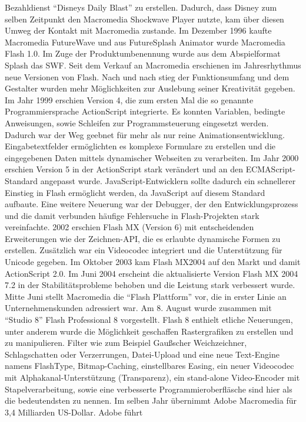 Bezahldienst ``Disneys Daily Blast'' zu erstellen. Dadurch, dass Disney zum
selben Zeitpunkt den Macromedia Shockwave Player nutzte, kam über diesen
Umweg der Kontakt mit Macromedia zustande. Im Dezember 1996 kaufte Macromedia
FutureWave und aus FutureSplash Animator wurde Macromedia Flash 1.0. Im
Zuge der Produktumbenennung wurde aus dem Abspielformat Splash das SWF.
Seit dem Verkauf an Macromedia erschienen im Jahresrhythmus neue Versionen
von Flash. Nach und nach stieg der Funktionsumfang und dem Gestalter
wurden mehr Möglichkeiten zur Auslebung seiner Kreativität gegeben. Im Jahr
1999 erschien Version 4, die zum ersten Mal die so genannte Programmiersprache
ActionScript integrierte. Es konnten Variablen, bedingte Anweisungen, sowie
Schleifen zur Programmsteuerung eingesetzt werden. Dadurch war der Weg
geebnet für mehr als nur reine Animationsentwicklung. Eingabetextfelder
ermöglichten es komplexe Formulare zu erstellen und die eingegebenen
Daten mittels dynamischer Webseiten zu verarbeiten. Im Jahr 2000 erschien
Version 5 in der ActionScript stark verändert und an den ECMAScript-Standard
angepasst wurde. JavaScript-Entwicklern sollte dadurch ein schnellerer
Einstieg in Flash ermöglicht werden, da JavaScript auf diesem Standard
aufbaute. Eine weitere Neuerung war der Debugger, der den Entwicklungsprozess
und die damit verbunden häufige Fehlersuche in Flash-Projekten stark
vereinfachte. 2002 erschien Flash MX (Version 6) mit entscheidenden
Erweiterungen wie der Zeichnen-API, die es erlaubte dynamische Formen zu
erstellen. Zusätzlich war ein Videocodec integriert und die Unterstützung für
Unicode gegeben. Im Oktober 2003 kam Flash MX2004 auf den Markt und damit
ActionScript 2.0. Im Juni 2004 erscheint die aktualisierte Version Flash
MX 2004 7.2 in der Stabilitätsprobleme behoben und die Leistung stark
verbessert wurde. Mitte Juni stellt Macromedia die "`Flash Plattform"' vor,
die in erster Linie an Unternehmenskunden adressiert war. Am 8. August wurde
zusammen mit "`Studio 8"' Flash Professional 8 vorgestellt. Flash 8 enthielt
etliche Neuerungen, unter anderem wurde die Möglichkeit geschaffen
Rastergrafiken zu erstellen und zu manipulieren. Filter wie zum Beispiel
Gaußscher Weichzeichner, Schlagschatten oder Verzerrungen, Datei-Upload und
eine neue Text-Engine namens FlashType, Bitmap-Caching, einstellbares
Easing, ein neuer Videocodec mit Alphakanal-Unterstützung (Transparenz), ein
stand-alone Video-Encoder mit Stapelverarbeitung, sowie eine verbesserte
Programmieroberfläsche sind hier als die bedeutendsten zu nennen. Im selben
Jahr übernimmt Adobe Macromedia für 3,4 Milliarden US-Dollar. Adobe führt
